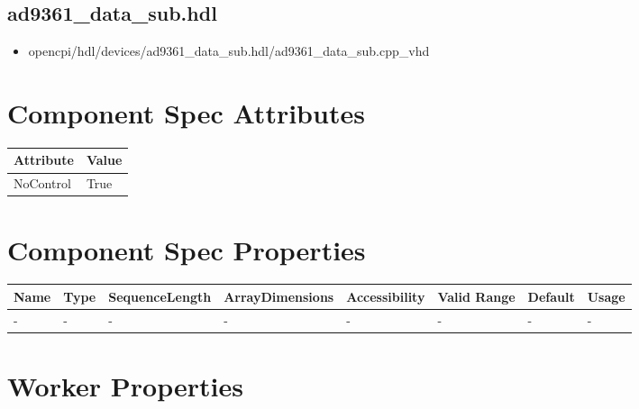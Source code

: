 \documentclass{article}
\def\comp{ad9361\_data\_sub}
\begin{document}
\subsection*{\comp.hdl}
\begin{itemize}
	\item opencpi/hdl/devices/ad9361\_data\_sub.hdl/ad9361\_data\_sub.cpp\_vhd
\end{itemize}
\begin{landscape}

	\section*{Component Spec Attributes}
	\begin{scriptsize}
		\begin{tabular}{|p{3.75cm}|p{18.84cm}|}
			\hline
			\rowcolor{blue}
			Attribute & Value \\
			\hline
			NoControl & True \\
			\hline
		\end{tabular}
	\end{scriptsize}
	
	\section*{Component Spec Properties}
	\begin{scriptsize}
		\begin{tabular}{|p{3.75cm}|p{1.25cm}|p{2cm}|p{2.75cm}|p{1.5cm}|p{1.5cm}|p{1cm}|p{6.23cm}|}
			\hline
			\rowcolor{blue}
			Name               & Type & SequenceLength & ArrayDimensions & Accessibility      & Valid Range & Default & Usage                                                                               \\
			\hline
			- & - & - & - & - & - & - & - \\
			\hline
		\end{tabular}
	\end{scriptsize}

	\section*{Worker Properties}

\end{landscape}
\end{document}
